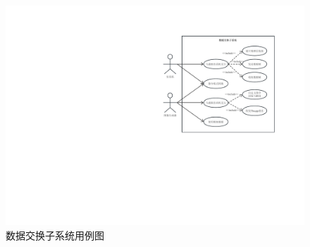 \begin{figure}[h!]
    \begin{center}
        \includegraphics[width=\textwidth]{pictures/usecase.pdf}
        \caption{数据交换子系统用例图}
        \label{usecase}
    \end{center}
\end{figure}

